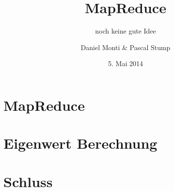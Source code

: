 \documentclass[compress,
               red]
              {beamer}
\title{MapReduce}
\subtitle{noch keine gute Idee} %
\author{Daniel Monti \& Pascal Stump}
\institute{HSR Hochschule für Technik Rapperswil}
\date{5. Mai 2014}
\begin{document}
\frame{
  \titlepage
}


\section{MapReduce}


\section{Eigenwert Berechnung}


\section{Schluss}


\end{document}

